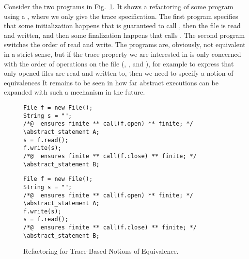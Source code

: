 Consider the two programs in Fig.~\ref{fig:sth}.
It shows a refactoring of some program using a , where we only give the trace specification.
The first program specifies that some initialization happens that is guaranteed to call , then the file is read and written,
and then some finalization happens that calls .
The second program switches the order of read and write.
The programs are, obviously, not equivalent in a strict sense, but if the trace property we are interested in is only concerned with the order of operations on the file 
(, ,  and ), for example to express that only opened files are read and written to, then we need to specify a notion of equivalences
It remains to be seen in how far abstract executions can be expanded with such a mechanism in the future.

\begin{figure}[tbp]
\begin{lstlisting}[style=refinity]
File f = new File();
String s = "";
/*@  ensures finite ** call(f.open) ** finite; */
\abstract_statement A;     
s = f.read();
f.write(s);
/*@  ensures finite ** call(f.close) ** finite; */
\abstract_statement B;     
\end{lstlisting}
\begin{lstlisting}[style=refinity]
File f = new File();
String s = "";
/*@  ensures finite ** call(f.open) ** finite; */
\abstract_statement A;     
f.write(s);
s = f.read();
/*@  ensures finite ** call(f.close) ** finite; */
\abstract_statement B;     
\end{lstlisting}
\caption{Refactoring for Trace-Based-Notions of Equivalence.}
\label{fig:sth}
\end{figure}




